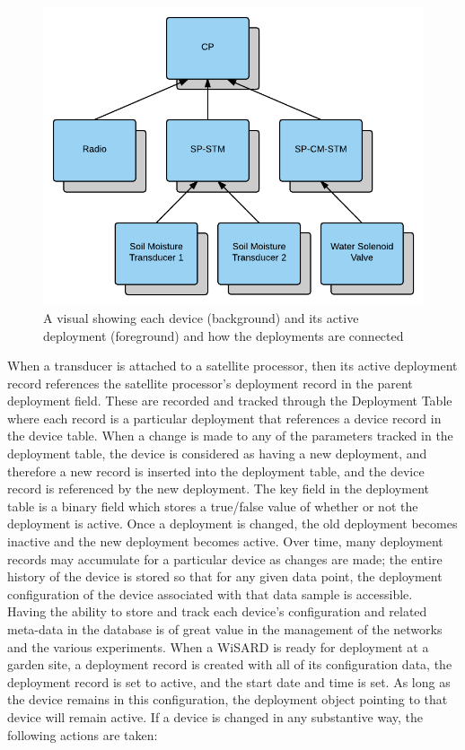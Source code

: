 \begin{figure}[H]
	\centering
	\includegraphics[width=\textwidth]{figures/deployment_hierarchy.png}
	\caption{A visual showing each device (background) and its active deployment (foreground) and how the deployments are connected}
	\label{fig:deployment_hierarchy_edit}
\end{figure}

When a transducer is attached to a satellite processor, then its active deployment record references the satellite processor's deployment record in the parent deployment field. These are recorded and tracked through the Deployment Table where each record is a particular deployment that references a device record in the device table. When a change is made to any of the parameters tracked in the deployment table, the device is considered as having a new deployment, and therefore a new record is inserted into the deployment table, and the device record is referenced by the new deployment. The key field in the deployment table is a binary field which stores a true/false value of whether or not the deployment is active. Once a deployment is changed, the old deployment becomes inactive and the new deployment becomes active. Over time, many deployment records may accumulate for a particular device as changes are made; the entire history of the device is stored so that for any given data point, the deployment configuration of the device associated with that data sample is accessible.\\

Having the ability to store and track each device's configuration and related meta-data in the database is of great value in the management of the networks and the various experiments. When a WiSARD is ready for deployment at a garden site, a deployment record is created with all of its configuration data, the deployment record is set to active, and the start date and time is set. As long as the device remains in this configuration, the deployment object pointing to that device will remain active. If a device is changed in any substantive way, the following actions are taken:

